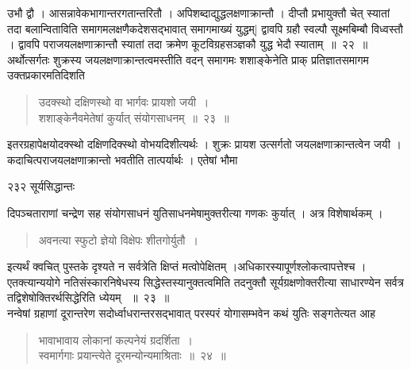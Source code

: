 \documentclass[11pt, openany]{book}
\begin{document}
 उभौ द्वौ । आसन्नावेकभागान्तरगतान्तरितौ । अपिशब्दाद्युद्धलक्षणाक्रान्तौ । दीप्तौ प्रभायुक्तौ चेत् स्यातां तदा बलान्विताविति समागमलक्षणैकदेशसद्भावात् समागमाख्यं युद्धम्| द्वावपि ग्रहौ स्वल्पौ सूक्ष्मबिम्बौ विध्वस्तौ । द्वावपि पराजयलक्षणाक्रान्तौ स्यातां तदा क्रमेण कूटविग्रहसञ्ज्ञकौ युद्ध भेदौ स्याताम्~॥~२२~॥\\
 अर्थोत्सर्गतः शुक्रस्य जयलक्षणाक्रान्तत्वमस्तीति वदन् समागमः शशाङ्केनेति प्राक् प्रतिज्ञातसमागम उक्तप्रकारमतिदिशति \textendash


\begin{quote}
{\ssi उदक्स्थो दक्षिणस्थो वा भार्गवः प्रायशो जयी~।\\
 शशाङ्केनैवमेतेषां कुर्यात् संयोगसाधनम्~॥~२३~॥ }
\end{quote}

 इतरग्रहापेक्षयोदक्स्थो दक्षिणदिक्स्थो वोभयदिशीत्यर्थः । शुक्रः प्रायश उत्सर्गतो जयलक्षणाक्रान्तत्वेन जयी । कदाचित्पराजयलक्षणाक्रान्तो भवतीति तात्पर्यार्थः ।  एतेषां भौमा \textendash


\newpage

\noindent २३२ \hspace{4cm} सूर्यसिद्धान्तः
\vspace{1cm}


\noindent दिपञ्चताराणां चन्द्रेण सह संयोगसाधनं युतिसाधनमेषामुक्तरीत्या गणकः कुर्यात् । अत्र विशेषार्थकम् ।

\begin{quote}
{\qt अवनत्या स्फुटो ज्ञेयो विक्षेपः शीतगोर्युतौ~।}\\
\end{quote}

\noindent इत्यर्थं क्वचित् पुस्तके दृश्यते न सर्वत्रेति क्षिप्तं मत्वोपेक्षितम् ।अधिकारस्यापूर्णश्लोकत्वापत्तेश्च । एतक्त्यान्ययोगे नतिसंस्कारनिषेधस्य सिद्धेस्तस्यानुक्तत्वमिति तदनुक्तौ सूर्यग्रक्षणोक्तरीत्या साधारण्येन सर्वत्र तद्विशेषोक्तिरर्थसिद्धेरिति ध्येयम् ~॥~२३~॥\\
\noindent नन्वेषां ग्रहाणां दूरान्तरेण सदोर्ध्वाधरान्तरसद्भावात् परस्परं योगासम्भवेन कथं युतिः सङ्गतेत्यत आह \textendash 


\begin{quote}
{\ssi भावाभावाय लोकानां कल्पनेयं ग्रदर्शिता~।\\
 स्वमार्गगाः प्रयान्त्येते दूरमन्योन्यमाश्रिताः~॥~२४~॥ }
\end{quote}
\end{document}
